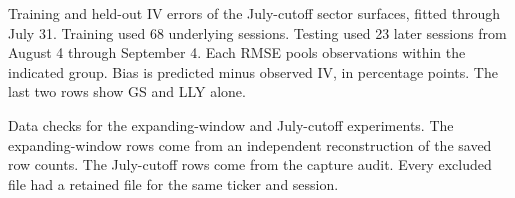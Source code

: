 \begin{table}[H]
\centering
\caption{Training and held-out IV errors of the July-cutoff sector surfaces, fitted through July 31. Training used 68 underlying sessions. Testing used 23 later sessions from August 4 through September 4. Each RMSE pools observations within the indicated group. Bias is predicted minus observed IV, in percentage points. The last two rows show GS and LLY alone.}\label{tab:chronological_surface}
\resizebox{\textwidth}{!}{}
\end{table}

\begin{table}[H]
\centering
\caption{Data checks for the expanding-window and July-cutoff experiments. The expanding-window rows come from an independent reconstruction of the saved row counts. The July-cutoff rows come from the capture audit. Every excluded file had a retained file for the same ticker and session.}\label{tab:chronological_data_audit}

\end{table}

